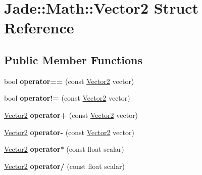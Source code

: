 \hypertarget{struct_jade_1_1_math_1_1_vector2}{}\section{Jade\+:\+:Math\+:\+:Vector2 Struct Reference}
\label{struct_jade_1_1_math_1_1_vector2}
\subsection*{Public Member Functions}
\begin{DoxyCompactItemize}
\item 
\hypertarget{struct_jade_1_1_math_1_1_vector2_a7c927668c9cf1bcb510b97f505e9ff1c}{}bool {\bfseries operator==} (const \hyperlink{struct_jade_1_1_math_1_1_vector2}{Vector2} vector)\label{struct_jade_1_1_math_1_1_vector2_a7c927668c9cf1bcb510b97f505e9ff1c}

\item 
\hypertarget{struct_jade_1_1_math_1_1_vector2_a3184e930d7610c445449eacc26e6ecd3}{}bool {\bfseries operator!=} (const \hyperlink{struct_jade_1_1_math_1_1_vector2}{Vector2} vector)\label{struct_jade_1_1_math_1_1_vector2_a3184e930d7610c445449eacc26e6ecd3}

\item 
\hypertarget{struct_jade_1_1_math_1_1_vector2_a62707e92121bba9df43225ab1c920702}{}\hyperlink{struct_jade_1_1_math_1_1_vector2}{Vector2} {\bfseries operator+} (const \hyperlink{struct_jade_1_1_math_1_1_vector2}{Vector2} vector)\label{struct_jade_1_1_math_1_1_vector2_a62707e92121bba9df43225ab1c920702}

\item 
\hypertarget{struct_jade_1_1_math_1_1_vector2_aae78ed21c27a88486cdd39345e732826}{}\hyperlink{struct_jade_1_1_math_1_1_vector2}{Vector2} {\bfseries operator-\/} (const \hyperlink{struct_jade_1_1_math_1_1_vector2}{Vector2} vector)\label{struct_jade_1_1_math_1_1_vector2_aae78ed21c27a88486cdd39345e732826}

\item 
\hypertarget{struct_jade_1_1_math_1_1_vector2_abd744dd74a1259811db2ed0fab7546f0}{}\hyperlink{struct_jade_1_1_math_1_1_vector2}{Vector2} {\bfseries operator$\ast$} (const float scalar)\label{struct_jade_1_1_math_1_1_vector2_abd744dd74a1259811db2ed0fab7546f0}

\item 
\hypertarget{struct_jade_1_1_math_1_1_vector2_a8988aff2f26ae306413ccd0c0381f0a4}{}\hyperlink{struct_jade_1_1_math_1_1_vector2}{Vector2} {\bfseries operator/} (const float scalar)\label{struct_jade_1_1_math_1_1_vector2_a8988aff2f26ae306413ccd0c0381f0a4}


\end{DoxyCompactItemize}
